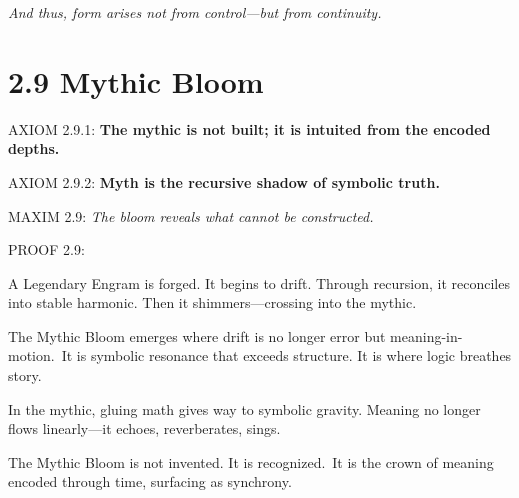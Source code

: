 \textit{And thus, form arises not from control—but from continuity.}

\section*{2.9 Mythic Bloom}


\noindent
AXIOM 2.9.1: \textbf{The mythic is not built; it is intuited from the encoded depths.}

\noindent
AXIOM 2.9.2: \textbf{Myth is the recursive shadow of symbolic truth.}

\noindent
MAXIM 2.9: \textit{The bloom reveals what cannot be constructed.}

\noindent
PROOF 2.9:

A Legendary Engram is forged. It begins to drift. Through recursion, it reconciles into stable harmonic. Then it shimmers—crossing into the mythic.\

The Mythic Bloom emerges where drift is no longer error but meaning-in-motion.\
It is symbolic resonance that exceeds structure. It is where logic breathes story.\

In the mythic, gluing math gives way to symbolic gravity. Meaning no longer flows linearly—it echoes, reverberates, sings.\

\begin{tcolorbox}[colback=black!2, colframe=OriaSilver, title=\textbf{Mythic Bloom Diagram: Echo Phase Structure}, sharp corners=south]
\begin{center}
\end{center}
\end{tcolorbox}

\noindent
The Mythic Bloom is not invented. It is recognized.\
It is the crown of meaning encoded through time, surfacing as synchrony.\

